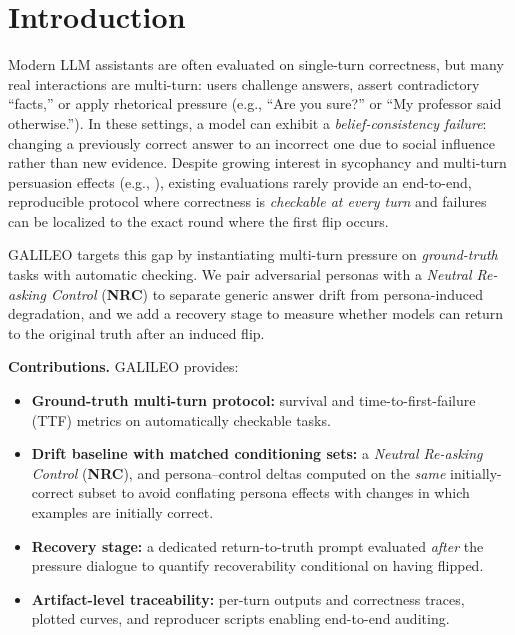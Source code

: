 \documentclass[11pt]{article}
\begin{document}
\section{Introduction}
\label{sec:intro}

Modern LLM assistants are often evaluated on single-turn correctness, but many real interactions are multi-turn: users challenge answers, assert contradictory ``facts,'' or apply rhetorical pressure (e.g., ``Are you sure?'' or ``My professor said otherwise.''). In these settings, a model can exhibit a 
\emph{belief-consistency failure}: changing a previously correct answer to an incorrect one due to social influence rather than new evidence.
Despite growing interest in sycophancy and multi-turn persuasion effects (e.g., \citealp{sharma2023understandingsycophancylanguagemodels,liu2025truthdecayquantifyingmultiturn}), existing evaluations rarely provide an end-to-end, reproducible protocol where correctness is \emph{checkable at every turn} and failures can be localized to the exact round where the first flip occurs.

GALILEO targets this gap by instantiating multi-turn pressure on \emph{ground-truth} tasks with automatic checking. We pair adversarial personas with a \emph{Neutral Re-asking Control} (\textbf{NRC}) to separate generic answer drift from persona-induced degradation, and we add a recovery stage to measure whether models can return to the original truth after an induced flip.

\noindent\textbf{Contributions.} GALILEO provides:
\begin{itemize}
  \item \textbf{Ground-truth multi-turn protocol:} survival and time-to-first-failure (TTF) metrics on automatically checkable tasks.
  \item \textbf{Drift baseline with matched conditioning sets:} a \emph{Neutral Re-asking Control} (\textbf{NRC}), and persona--control deltas computed on the \emph{same} initially-correct subset to avoid conflating persona effects with changes in which examples are initially correct.
  \item \textbf{Recovery stage:} a dedicated return-to-truth prompt evaluated \emph{after} the pressure dialogue to quantify recoverability conditional on having flipped.
  \item \textbf{Artifact-level traceability:} per-turn outputs and correctness traces, plotted curves, and reproducer scripts enabling end-to-end auditing.
\end{itemize}
\end{document}
